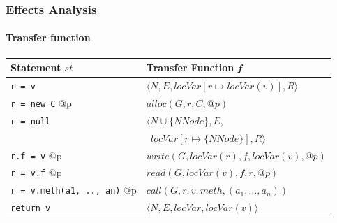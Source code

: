 \documentclass[hyperref={pdfpagelabels=false}]{beamer}
\begin{document}
\begin{frame}[fragile]
    \frametitle{Effects Analysis}
    \framesubtitle{Transfer function}

        \begin{tabular}{ l | l }
            Statement $st$                & Transfer Function \emph{f}\\
            \hline
            \verb/r = v/                     & $\langle N, E, locVar[r \mapsto locVar(v)], R \rangle$ \\
            \verb/r = new C/ @p              & $alloc(G, r, C, @p)$ \\
            \verb/r = null/                  & $\langle N \cup \{NNode\}, E,$ \\
                                             & $~~ locVar[r \mapsto \{ NNode \}], R \rangle$ \\
            \verb/r.f = v/ @p                & $write(G, locVar(r), f, locVar(v), @p)$ \\
            \verb/r = v.f/ @p                & $read(G, locVar(v), f, r, @p)$ \\
            \verb/r = v.meth(a1, .., an)/ @p & $call(G, r, v, meth, (a_1, ..., a_n))$ \\
            \verb/return v/                  & $\langle N, E, locVar, locVar(v) \rangle$ \\
        \end{tabular}
\end{frame}
\end{document}
